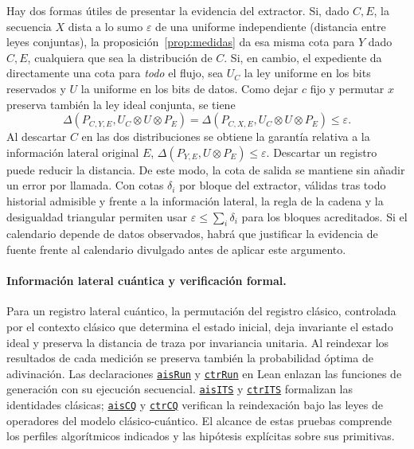 \documentclass[11pt,a4paper]{article}
\newcommand{\leanlink}[2]{\href{https://github.com/jordiprga/technical-work/blob/8fec7ab9275547be9d74f394aa4fecbd86a13903/operation-token-burn-2026-11-14/00_coordination/ptg3-its/formal/Composition.lean\#L#1}{\texttt{#2}}}
\begin{document}
Hay dos formas útiles de presentar la evidencia del extractor. Si, dado \(C,E\), la secuencia \(X\) dista a lo sumo \(\varepsilon\) de una uniforme independiente (distancia entre leyes conjuntas), la proposición~\ref{prop:medidas} da esa misma cota para \(Y\) dado \(C,E\), cualquiera que sea la distribución de \(C\). Si, en cambio, el expediente da directamente una cota para \emph{todo} el flujo, sea \(U_C\) la ley uniforme en los bits reservados y \(U\) la uniforme en los bits de datos. Como dejar \(c\) fijo y permutar \(x\) preserva también la ley ideal conjunta, se tiene
\[
 \Delta(P_{C,Y,E},U_C\otimes U\otimes P_E)
 =\Delta(P_{C,X,E},U_C\otimes U\otimes P_E)\le\varepsilon .
\]
Al descartar \(C\) en las dos distribuciones se obtiene la garantía relativa a la información lateral original \(E\), \(\Delta(P_{Y,E},U\otimes P_E)\le\varepsilon\). Descartar un registro puede reducir la distancia. De este modo, la cota de salida se mantiene sin añadir un error por llamada. Con cotas \(\delta_i\) por bloque del extractor, válidas tras todo historial admisible y frente a la información lateral, la regla de la cadena y la desigualdad triangular permiten usar \(\varepsilon\le\sum_i\delta_i\) para los bloques acreditados. Si el calendario depende de datos observados, habrá que justificar la evidencia de fuente frente al calendario divulgado antes de aplicar este argumento.

\paragraph{Información lateral cuántica y verificación formal.}
Para un registro lateral cuántico, la permutación del registro clásico, controlada por el contexto clásico que determina el estado inicial, deja invariante el estado ideal y preserva la distancia de traza por invariancia unitaria. Al reindexar los resultados de cada medición se preserva también la probabilidad óptima de adivinación. Las declaraciones \leanlink{37}{aisRun} y \leanlink{43}{ctrRun} en Lean enlazan las funciones de generación con su ejecución secuencial. \leanlink{53}{aisITS} y \leanlink{61}{ctrITS} formalizan las identidades clásicas; \leanlink{79}{aisCQ} y \leanlink{87}{ctrCQ} verifican la reindexación bajo las leyes de operadores del modelo clásico-cuántico. El alcance de estas pruebas comprende los perfiles algorítmicos indicados y las hipótesis explícitas sobre sus primitivas.
\end{document}
